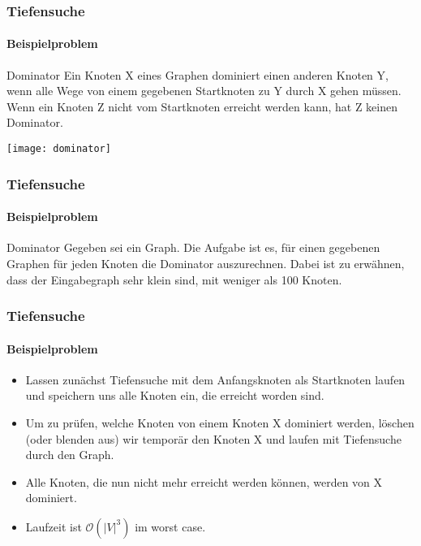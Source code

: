
\begin{frame}
	\frametitle{Tiefensuche}
	\framesubtitle{Beispielproblem}
	\begin{KITinfoblock}{Dominator}
		Ein Knoten X eines Graphen dominiert einen anderen Knoten Y, wenn alle Wege von einem gegebenen Startknoten zu Y durch X gehen müssen. Wenn ein Knoten Z nicht vom Startknoten erreicht werden kann, hat Z keinen Dominator.
	\end{KITinfoblock}
	\begin{center}
			\texttt{[image: dominator]}
	\end{center}
\end{frame}

\begin{frame}
	\frametitle{Tiefensuche}
	\framesubtitle{Beispielproblem}
		\begin{KITexampleblock}{Dominator}
			Gegeben sei ein Graph. Die Aufgabe ist es, für einen gegebenen Graphen für jeden Knoten die Dominator auszurechnen. Dabei ist zu erwähnen, dass der Eingabegraph sehr klein sind, mit weniger als 100 Knoten.
		\end{KITexampleblock}
\end{frame}

\begin{frame}
	\frametitle{Tiefensuche}
	\framesubtitle{Beispielproblem}
		\begin{itemize}
			\item Lassen zunächst Tiefensuche mit dem Anfangsknoten als Startknoten laufen und speichern uns alle Knoten ein, die erreicht worden sind.
			\pause
			\bigskip
			\item Um zu prüfen, welche Knoten von einem Knoten X dominiert werden, löschen (oder blenden aus) wir temporär den Knoten X und laufen mit Tiefensuche durch den Graph.
						\pause
						\bigskip
			\item Alle Knoten, die nun nicht mehr erreicht werden können, werden von X dominiert.
						\pause
						\bigskip
			\item Laufzeit ist $\mathcal{O}(|V|^3)$ im worst case.
		\end{itemize}
\end{frame}
